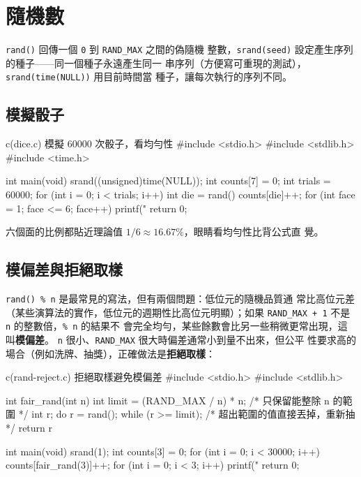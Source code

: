 \section{隨機數}
\label{sec:sl-rand}

\texttt{rand()} 回傳一個 \texttt{0} 到 \texttt{RAND\_MAX} 之間的偽隨機
整數，\texttt{srand(seed)} 設定產生序列的種子——同一個種子永遠產生同一
串序列（方便寫可重現的測試），\texttt{srand(time(NULL))} 用目前時間當
種子，讓每次執行的序列不同。

\subsection{模擬骰子}

\begin{example}{c}{(dice.c) 模擬 60000 次骰子，看均勻性}
#include <stdio.h>
#include <stdlib.h>
#include <time.h>

int main(void) {
    srand((unsigned)time(NULL));
    int counts[7] = {0};
    int trials = 60000;
    for (int i = 0; i < trials; i++) {
        int die = rand() %
        counts[die]++;
    }
    for (int face = 1; face <= 6; face++) {
        printf("%
    }
    return 0;
}
\end{example}


六個面的比例都貼近理論值 $1/6 \approx 16.67\%$，眼睛看均勻性比背公式直
覺。

\subsection{模偏差與拒絕取樣}

\texttt{rand() \% n} 是最常見的寫法，但有兩個問題：低位元的隨機品質通
常比高位元差（某些演算法的實作，低位元的週期性比高位元明顯）；如果
\texttt{RAND\_MAX + 1} 不是 \texttt{n} 的整數倍，\texttt{\% n} 的結果不
會完全均勻，某些餘數會比另一些稍微更常出現，這叫\textbf{模偏差}。
\texttt{n} 很小、\texttt{RAND\_MAX} 很大時偏差通常小到量不出來，但公平
性要求高的場合（例如洗牌、抽獎），正確做法是\textbf{拒絕取樣}：

\begin{example}{c}{(rand-reject.c) 拒絕取樣避免模偏差}
#include <stdio.h>
#include <stdlib.h>

int fair_rand(int n) {
    int limit = (RAND_MAX / n) * n; /* 只保留能整除 n 的範圍 */
    int r;
    do {
        r = rand();
    } while (r >= limit); /* 超出範圍的值直接丟掉，重新抽 */
    return r %
}

int main(void) {
    srand(1);
    int counts[3] = {0};
    for (int i = 0; i < 30000; i++) counts[fair_rand(3)]++;
    for (int i = 0; i < 3; i++) printf("%
    return 0;
}
\end{example}

